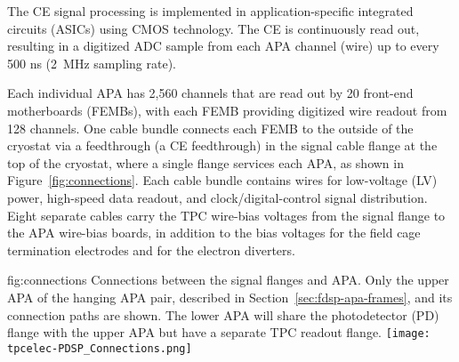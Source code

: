 The CE signal processing is implemented in application-specific integrated circuits (ASICs)
using CMOS technology.  The CE is continuously read out, resulting in a digitized ADC
sample from each APA channel (wire) up to every 500 ns (2~MHz sampling rate).

Each individual APA has 2,560 channels that are read out by 20 front-end motherboards (FEMBs), with
each FEMB providing digitized wire readout from 128 channels.  One cable bundle connects each FEMB to
the outside of the cryostat via a feedthrough (a CE feedthrough) in the signal cable flange at the
top of the cryostat, where a single flange services each APA, as shown in Figure~\ref{fig:connections}.
Each cable bundle contains wires for low-voltage (LV) power, high-speed data readout, and
clock/digital-control signal distribution.  Eight separate cables carry the TPC wire-bias voltages
from the signal flange to the APA wire-bias boards, in addition to the bias voltages for the field
cage termination electrodes and for the electron diverters.

\begin{dunefigure}
{fig:connections}
{Connections between the signal flanges and APA. Only the upper APA of the hanging APA pair, described in Section~\ref{sec:fdsp-apa-frames}, and its connection paths are shown. The lower APA will share the photodetector (PD) flange with the upper APA but have a separate TPC readout flange.}
\hspace{1cm}
\texttt{[image: tpcelec-PDSP\_Connections.png]}
\end{dunefigure}

